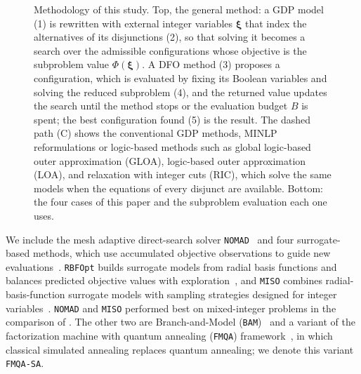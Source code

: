 \documentclass{article}
\newcommand{\figbox}[3]{\parbox[t][#1][t]{#2}{\raggedright\hyphenpenalty=10000\exhyphenpenalty=10000\setlength{\baselineskip}{9pt}#3}}
\begin{document}
\begin{figure}[tbp]
\caption{Methodology of this study.
Top, the general method: a GDP model (1) is rewritten with external integer variables \(\boldsymbol\xi\) that index the alternatives of its disjunctions (2), so that solving it becomes a search over the admissible configurations whose objective is the subproblem value \(\Phi(\boldsymbol\xi)\).
A DFO method (3) proposes a configuration, which is evaluated by fixing its Boolean variables and solving the reduced subproblem (4), and the returned value updates the search until the method stops or the evaluation budget \(B\) is spent; the best configuration found (5) is the result.
The dashed path (C) shows the conventional GDP methods, MINLP reformulations or logic-based methods such as global logic-based outer approximation (GLOA), logic-based outer approximation (LOA), and relaxation with integer cuts (RIC), which solve the same models when the equations of every disjunct are available.
Bottom: the four cases of this paper and the subproblem evaluation each one uses.}
\label{fig:methodology}
\end{figure}
We include the mesh adaptive direct-search solver \texttt{NOMAD}~\citep{audet2022nomad} and four surrogate-based methods, which use accumulated objective observations to guide new evaluations~\citep{larson2019derivative}.
\texttt{RBFOpt} builds surrogate models from radial basis functions and balances predicted objective values with exploration~\citep{costa2018rbfopt}, and \texttt{MISO} combines radial-basis-function surrogate models with sampling strategies designed for integer variables~\citep{muller2016miso}.
\texttt{NOMAD} and \texttt{MISO} performed best on mixed-integer problems in the comparison of \citet{ploskas2022review}.
The other two are Branch-and-Model (\texttt{BAM})~\citep{ma2023bam} and a variant of the factorization machine with quantum annealing (\texttt{FMQA}) framework~\citep{kitai2020designing}, in which classical simulated annealing replaces quantum annealing; we denote this variant \texttt{FMQA-SA}.
\end{document}
